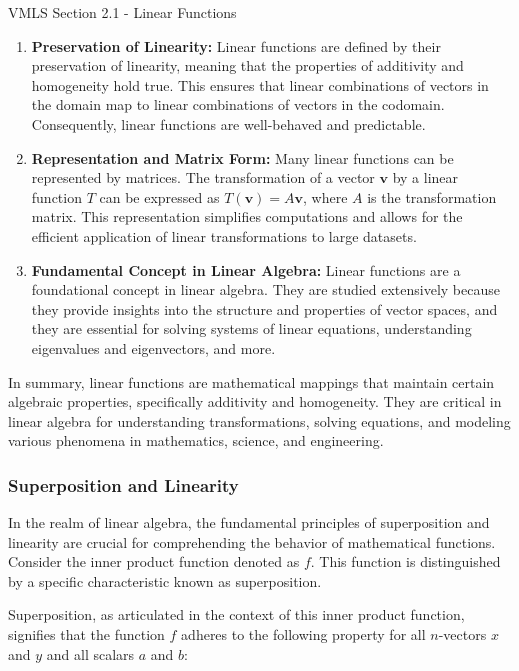 \begin{notes}{VMLS Section 2.1 - Linear Functions}
\begin{enumerate}
        \item \textbf{Preservation of Linearity:} Linear functions are defined by their preservation of linearity, meaning that the properties of additivity and homogeneity hold true. This ensures that linear 
        combinations of vectors in the domain map to linear combinations of vectors in the codomain. Consequently, linear functions are well-behaved and predictable.
        
        \item \textbf{Representation and Matrix Form:} Many linear functions can be represented by matrices. The transformation of a vector \(\mathbf{v}\) by a linear function \(T\) can be expressed as \(T(\mathbf{v}) 
        = A\mathbf{v}\), where \(A\) is the transformation matrix. This representation simplifies computations and allows for the efficient application of linear transformations to large datasets.
        
        \item \textbf{Fundamental Concept in Linear Algebra:} Linear functions are a foundational concept in linear algebra. They are studied extensively because they provide insights into the structure and 
        properties of vector spaces, and they are essential for solving systems of linear equations, understanding eigenvalues and eigenvectors, and more.
    \end{enumerate}
    
    In summary, linear functions are mathematical mappings that maintain certain algebraic properties, specifically additivity and homogeneity. They are critical in linear algebra for understanding transformations, 
    solving equations, and modeling various phenomena in mathematics, science, and engineering.

    \subsubsection*{Superposition and Linearity}

    In the realm of linear algebra, the fundamental principles of superposition and linearity are crucial for comprehending the behavior of mathematical functions. Consider the inner product function denoted as \(f\). 
    This function is distinguished by a specific characteristic known as superposition.
    
    Superposition, as articulated in the context of this inner product function, signifies that the function \(f\) adheres to the following property for all \(n\)-vectors \(x\) and \(y\) and all scalars \(a\) and \(b\):
    

\end{notes}
